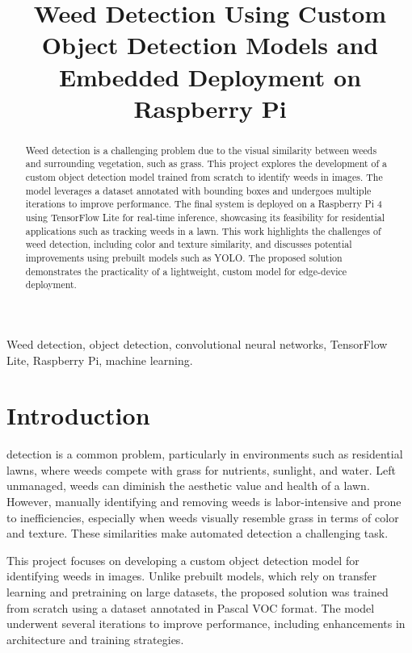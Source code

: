 \documentclass[conference]{IEEEtran}
\title{Weed Detection Using Custom Object Detection Models and Embedded Deployment on Raspberry Pi}
\author{
    \IEEEauthorblockN{Christopher Arredondo}
    \IEEEauthorblockA{\textit{Costa Rica Institute of Technology} \\
    Email: chrisarrefal@estudiantec.cr}
}
\begin{document}
\maketitle

\begin{abstract}
Weed detection is a challenging problem due to the visual similarity between weeds and surrounding vegetation, such as grass. This project explores the development of a custom object detection model trained from scratch to identify weeds in images. The model leverages a dataset annotated with bounding boxes and undergoes multiple iterations to improve performance. The final system is deployed on a Raspberry Pi 4 using TensorFlow Lite for real-time inference, showcasing its feasibility for residential applications such as tracking weeds in a lawn. This work highlights the challenges of weed detection, including color and texture similarity, and discusses potential improvements using prebuilt models such as YOLO. The proposed solution demonstrates the practicality of a lightweight, custom model for edge-device deployment.
\end{abstract}

\begin{IEEEkeywords}
Weed detection, object detection, convolutional neural networks, TensorFlow Lite, Raspberry Pi, machine learning.
\end{IEEEkeywords}

\section{Introduction}
 detection is a common problem, particularly in environments such as residential lawns, where weeds compete with grass for nutrients, sunlight, and water. Left unmanaged, weeds can diminish the aesthetic value and health of a lawn. However, manually identifying and removing weeds is labor-intensive and prone to inefficiencies, especially when weeds visually resemble grass in terms of color and texture. These similarities make automated detection a challenging task.

This project focuses on developing a custom object detection model for identifying weeds in images. Unlike prebuilt models, which rely on transfer learning and pretraining on large datasets, the proposed solution was trained from scratch using a dataset annotated in Pascal VOC format. The model underwent several iterations to improve performance, including enhancements in architecture and training strategies.
\end{document}
